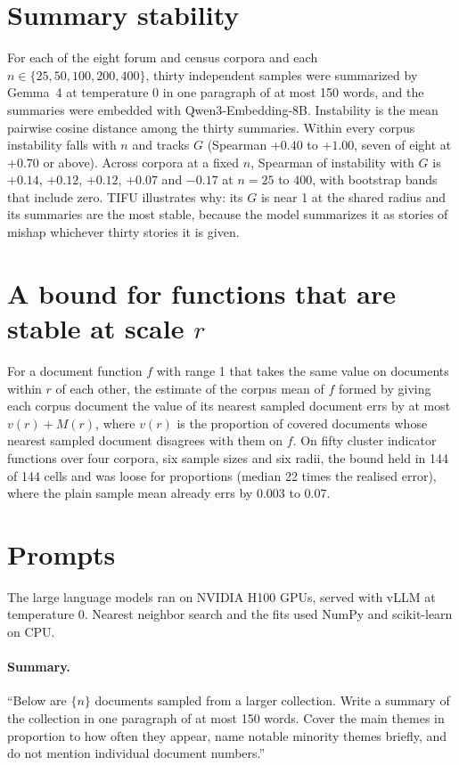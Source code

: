 \section{Summary stability}
\label{app:summaries}

For each of the eight forum and census corpora and each $n \in \{25, 50, 100, 200, 400\}$, thirty independent samples were summarized by Gemma~4 at temperature 0 in one paragraph of at most 150 words, and the summaries were embedded with Qwen3-Embedding-8B. Instability is the mean pairwise cosine distance among the thirty summaries. Within every corpus instability falls with $n$ and tracks $G$ (Spearman $+0.40$ to $+1.00$, seven of eight at $+0.70$ or above). Across corpora at a fixed $n$, Spearman of instability with $G$ is $+0.14$, $+0.12$, $+0.12$, $+0.07$ and $-0.17$ at $n = 25$ to 400, with bootstrap bands that include zero. TIFU illustrates why: its $G$ is near 1 at the shared radius and its summaries are the most stable, because the model summarizes it as stories of mishap whichever thirty stories it is given.

\section{A bound for functions that are stable at scale $r$}
\label{app:bound}

For a document function $f$ with range 1 that takes the same value on documents within $r$ of each other, the estimate of the corpus mean of $f$ formed by giving each corpus document the value of its nearest sampled document errs by at most $v(r) + M(r)$, where $v(r)$ is the proportion of covered documents whose nearest sampled document disagrees with them on $f$. On fifty cluster indicator functions over four corpora, six sample sizes and six radii, the bound held in 144 of 144 cells and was loose for proportions (median 22 times the realised error), where the plain sample mean already errs by 0.003 to 0.07.

\section{Prompts}
\label{app:prompts}

The large language models ran on NVIDIA H100 GPUs, served with vLLM \citep{kwon2023vllm} at temperature 0. Nearest neighbor search and the fits used NumPy and scikit-learn \citep{pedregosa2011sklearn} on CPU.

\paragraph{Summary.} ``Below are $\{n\}$ documents sampled from a larger collection. Write a summary of the collection in one paragraph of at most 150 words. Cover the main themes in proportion to how often they appear, name notable minority themes briefly, and do not mention individual document numbers.''

